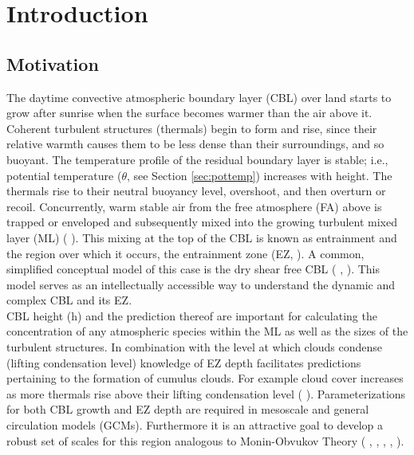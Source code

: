 \chapter{Introduction} 
\label{ch:Introduction}
\setlength{\parindent}{0cm}

\section{Motivation}
\label{sec:Mot}

The daytime convective atmospheric boundary layer (\acs{CBL}) over land starts to grow after sunrise when the surface becomes warmer than the air above it.  Coherent turbulent structures (thermals) begin to form and rise, since their relative warmth causes them to be less dense than their surroundings, and so buoyant.  The temperature profile of the residual boundary layer is stable; i.e., potential temperature ($\theta$, see Section \ref{sec:pottemp}) increases with height.  The thermals rise to their neutral buoyancy level, overshoot, and then overturn or recoil.  Concurrently, warm stable air from the free atmosphere (FA) above is trapped or enveloped and subsequently mixed into the growing turbulent mixed layer (\acs{ML}) (\citeauthor{Stull-BLMetIntro} \citeyear{Stull-BLMetIntro}).  This mixing at the top of the \acs{CBL} is known as entrainment and the region over which it occurs, the entrainment zone (\acs{EZ}, \citeauthor{DearWill80} \citeyear{DearWill80}). A common, simplified conceptual model of this case is the dry shear free \acs{CBL} (\citeauthor{SullMoengStev} \citeyear{SullMoengStev}, \citeauthor{FedConzMir04} \citeyear{FedConzMir04} \citeauthor{BrooksFowler2} \citeyear{BrooksFowler2}). This model serves as an intellectually accessible way to understand the dynamic and complex \acs{CBL} and its \acs{EZ}.\\

\acs{CBL} height (h) and the prediction thereof are important for calculating the concentration of any atmospheric species within the \acs{ML} as well as the sizes of the turbulent structures.  In combination with the level at which clouds condense (lifting condensation level) knowledge of \acs{EZ} depth facilitates predictions pertaining to the formation of cumulus clouds.  For example cloud cover increases as more thermals rise above their lifting condensation level (\citeauthor{WilStu} \citeyear{WilStu}).  Parameterizations for both \acs{CBL} growth and \acs{EZ} depth are required in mesoscale and general circulation models (\acs{GCM}s).  Furthermore it is an attractive goal to develop a robust set of scales for this region analogous to Monin-Obvukov Theory (\citeauthor{Stull-BLMetIntro} \citeyear{Stull-BLMetIntro}, \citeauthor{Traum11} \citeyear{Traum11}, \citeauthor{SteynBaldHoff} \citeyear{SteynBaldHoff}, \citeauthor{StullNelEl} \citeyear{StullNelEl}, \citeauthor{Sorbjan1} \citeyear{Sorbjan1}).\\


